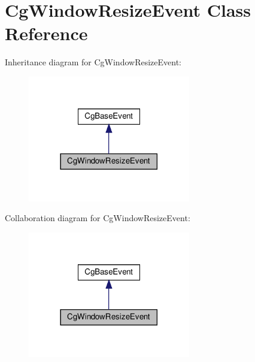 \hypertarget{class_cg_window_resize_event}{}\section{Cg\+Window\+Resize\+Event Class Reference}
\label{class_cg_window_resize_event}


Inheritance diagram for Cg\+Window\+Resize\+Event\+:
\nopagebreak
\begin{figure}[H]
\begin{center}
\leavevmode
\includegraphics[width=201pt]{class_cg_window_resize_event__inherit__graph}
\end{center}
\end{figure}


Collaboration diagram for Cg\+Window\+Resize\+Event\+:
\nopagebreak
\begin{figure}[H]
\begin{center}
\leavevmode
\includegraphics[width=201pt]{class_cg_window_resize_event__coll__graph}
\end{center}
\end{figure}
